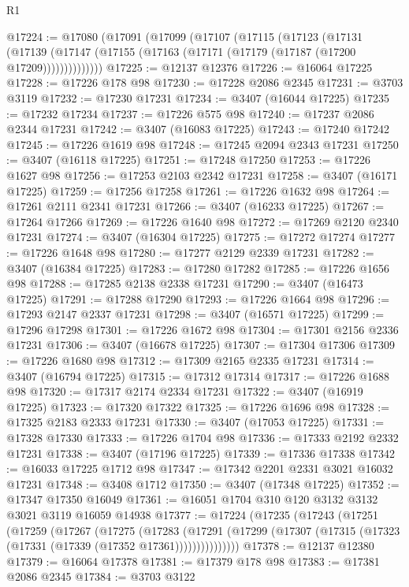 \begin{lexlean}{R1}
\begin{coremodule}
@17224 := @17080
    (@17091
      (@17099
        (@17107
          (@17115
            (@17123
              (@17131
                (@17139 (@17147 (@17155 (@17163 (@17171 (@17179 (@17187 (@17200 @17209))))))))))))))
@17225 := @12137 @12376
@17226 := @16064 @17225
@17228 := @17226 @178 @98
@17230 := @17228 @2086 @2345
@17231 := @3703 @3119
@17232 := @17230 @17231
@17234 := @3407 (@16044 @17225)
@17235 := @17232 @17234
@17237 := @17226 @575 @98
@17240 := @17237 @2086 @2344 @17231
@17242 := @3407 (@16083 @17225)
@17243 := @17240 @17242
@17245 := @17226 @1619 @98
@17248 := @17245 @2094 @2343 @17231
@17250 := @3407 (@16118 @17225)
@17251 := @17248 @17250
@17253 := @17226 @1627 @98
@17256 := @17253 @2103 @2342 @17231
@17258 := @3407 (@16171 @17225)
@17259 := @17256 @17258
@17261 := @17226 @1632 @98
@17264 := @17261 @2111 @2341 @17231
@17266 := @3407 (@16233 @17225)
@17267 := @17264 @17266
@17269 := @17226 @1640 @98
@17272 := @17269 @2120 @2340 @17231
@17274 := @3407 (@16304 @17225)
@17275 := @17272 @17274
@17277 := @17226 @1648 @98
@17280 := @17277 @2129 @2339 @17231
@17282 := @3407 (@16384 @17225)
@17283 := @17280 @17282
@17285 := @17226 @1656 @98
@17288 := @17285 @2138 @2338 @17231
@17290 := @3407 (@16473 @17225)
@17291 := @17288 @17290
@17293 := @17226 @1664 @98
@17296 := @17293 @2147 @2337 @17231
@17298 := @3407 (@16571 @17225)
@17299 := @17296 @17298
@17301 := @17226 @1672 @98
@17304 := @17301 @2156 @2336 @17231
@17306 := @3407 (@16678 @17225)
@17307 := @17304 @17306
@17309 := @17226 @1680 @98
@17312 := @17309 @2165 @2335 @17231
@17314 := @3407 (@16794 @17225)
@17315 := @17312 @17314
@17317 := @17226 @1688 @98
@17320 := @17317 @2174 @2334 @17231
@17322 := @3407 (@16919 @17225)
@17323 := @17320 @17322
@17325 := @17226 @1696 @98
@17328 := @17325 @2183 @2333 @17231
@17330 := @3407 (@17053 @17225)
@17331 := @17328 @17330
@17333 := @17226 @1704 @98
@17336 := @17333 @2192 @2332 @17231
@17338 := @3407 (@17196 @17225)
@17339 := @17336 @17338
@17342 := @16033 @17225 @1712 @98
@17347 := @17342 @2201 @2331 @3021 @16032 @17231
@17348 := @3408 @1712
@17350 := @3407 (@17348 @17225)
@17352 := @17347 @17350 @16049
@17361 := @16051 @1704 @310 @120 @3132 @3132 @3021 @3119 @16059 @14938
@17377 := @17224
    (@17235
      (@17243
        (@17251
          (@17259
            (@17267
              (@17275
                (@17283
                  (@17291
                    (@17299 (@17307 (@17315 (@17323 (@17331 (@17339 (@17352 @17361)))))))))))))))
@17378 := @12137 @12380
@17379 := @16064 @17378
@17381 := @17379 @178 @98
@17383 := @17381 @2086 @2345
@17384 := @3703 @3122

\end{coremodule}
\end{lexlean}
